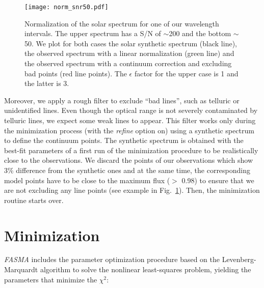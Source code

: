 \documentclass[fleqn,usenatbib]{mnras}
\begin{document}
\begin{figure}
  \centering
   \texttt{[image: norm\_snr50.pdf]}
  \caption{Normalization of the solar spectrum for one of our wavelength intervals. The upper spectrum has a S/N of $\sim$200 and the bottom $\sim$50. 
  We plot for both cases the solar synthetic spectrum (black line), the observed spectrum with a linear normalization (green line) and the observed spectrum 
  with a continuum correction and excluding bad points (red line points). The $\epsilon$ factor for the upper case is 1 and the latter is 3.}
  \label{snr}
  \end{figure}

Moreover, we apply a rough filter to exclude ``bad lines'', such as telluric or unidentified lines. Even though the optical range is not severely contaminated by telluric lines, 
we expect some weak lines to appear. 
This filter works only during the minimization process (with the \textit{refine} option on) using a synthetic spectrum to define the continuum points. 
The synthetic spectrum is obtained with the best-fit parameters of a first run of the minimization procedure to be realistically close to the observations. 
We discard the points of our observations which show 3\% difference from the synthetic ones and at the same time, the corresponding model points have to be close to the maximum flux 
($>$ 0.98) to ensure that we are not excluding any line points (see example in Fig.~\ref{snr}). Then, the minimization routine starts over. 

\section{Minimization}\label{minimization}

\textit{FASMA} includes the parameter optimization procedure based on the Levenberg-Marquardt algorithm \citep{Marquardt63} to solve the nonlinear least-squares problem, 
yielding the parameters that minimize the $\chi^{2}$:
\end{document}
